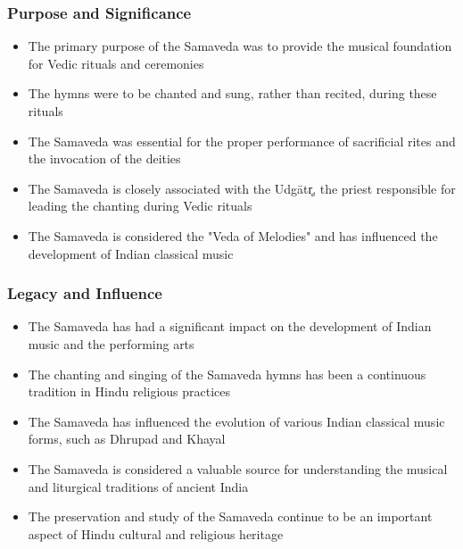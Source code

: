 \begin{frame}[fragile]\frametitle{Purpose and Significance}
    \begin{itemize}
        \item The primary purpose of the Samaveda was to provide the musical foundation for Vedic rituals and ceremonies
        \item The hymns were to be chanted and sung, rather than recited, during these rituals
        \item The Samaveda was essential for the proper performance of sacrificial rites and the invocation of the deities
        \item The Samaveda is closely associated with the Udgātr̥, the priest responsible for leading the chanting during Vedic rituals
        \item The Samaveda is considered the "Veda of Melodies" and has influenced the development of Indian classical music
    \end{itemize}
\end{frame}

\begin{frame}[fragile]\frametitle{Legacy and Influence}
    \begin{itemize}
        \item The Samaveda has had a significant impact on the development of Indian music and the performing arts
        \item The chanting and singing of the Samaveda hymns has been a continuous tradition in Hindu religious practices
        \item The Samaveda has influenced the evolution of various Indian classical music forms, such as Dhrupad and Khayal
        \item The Samaveda is considered a valuable source for understanding the musical and liturgical traditions of ancient India
        \item The preservation and study of the Samaveda continue to be an important aspect of Hindu cultural and religious heritage
    \end{itemize}
\end{frame}
